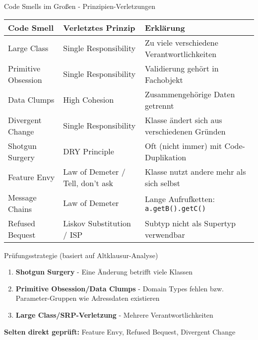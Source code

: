 \begin{frame}{Code Smells im Großen - Prinzipien-Verletzungen}
  \footnotesize
  \renewcommand{\arraystretch}{1.15}
  \begin{tabular}{|l|l|l|}
    \hline
    \textbf{Code Smell} & \textbf{Verletztes Prinzip} & \textbf{Erklärung} \\
    \hline
    \hline
    Large Class & Single Responsibility & Zu viele verschiedene Verantwortlichkeiten \\
    \hline
    Primitive Obsession & Single Responsibility & Validierung gehört in Fachobjekt \\
    \hline
    Data Clumps & High Cohesion & Zusammengehörige Daten getrennt \\
    \hline
    Divergent Change & Single Responsibility & Klasse ändert sich aus verschiedenen Gründen \\
    \hline
    Shotgun Surgery & DRY Principle & Oft (nicht immer) mit Code-Duplikation \\
    \hline
    Feature Envy & Law of Demeter / Tell, don't ask & Klasse nutzt andere mehr als sich selbst \\
    \hline
    Message Chains & Law of Demeter & Lange Aufrufketten: \texttt{a.getB().getC()} \\
    \hline
    Refused Bequest & Liskov Substitution / ISP & Subtyp nicht als Supertyp verwendbar \\
    \hline
  \end{tabular}

  \begin{exampleblock}{\small Prüfungsstrategie (basiert auf Altklausur-Analyse)}
    \begin{enumerate}
      \item \textbf{Shotgun Surgery} - Eine Änderung betrifft viele Klassen
      \item \textbf{Primitive Obsession/Data Clumps} - Domain Types fehlen bzw. Parameter-Gruppen wie Adressdaten existieren
      \item \textbf{Large Class/SRP-Verletzung} - Mehrere Verantwortlichkeiten
    \end{enumerate}
    \textbf{Selten direkt geprüft:} Feature Envy, Refused Bequest, Divergent Change
  \end{exampleblock}
\end{frame}

